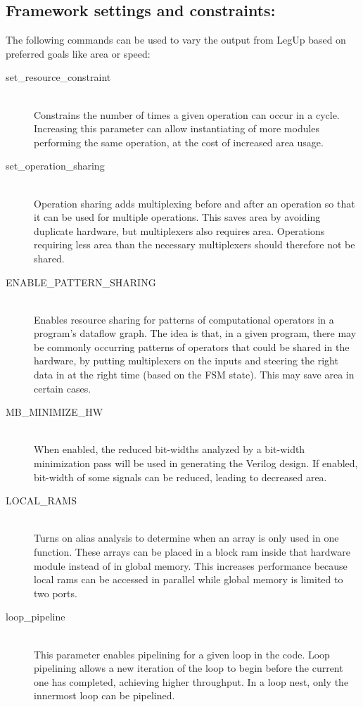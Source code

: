\subsection{Framework settings and constraints:}
The following commands can be used to vary the output from LegUp based on preferred goals like area or speed:
\begin{description}
  \item[set\_resource\_constraint] \hfill \\
      Constrains the number of times a given operation can occur in a cycle. Increasing this parameter can allow instantiating of more modules performing the same operation, at the cost of increased area usage. 
  \item[set\_operation\_sharing] \hfill \\
      Operation sharing adds multiplexing before and after an operation so that it can be used for multiple operations. This saves area by avoiding duplicate hardware, but multiplexers also requires area. Operations requiring less area than the necessary multiplexers should therefore not be shared.
  \item[ENABLE\_PATTERN\_SHARING] \hfill \\
      Enables resource sharing for patterns of computational operators in a program’s dataflow graph. The idea is that, in a given program, there may be commonly occurring patterns of operators that could be shared in the hardware, by putting multiplexers on the inputs and steering the right data in at the right time (based on the FSM state). This may save area in certain cases. \cite{hadjis2012impact}
  \item[MB\_MINIMIZE\_HW] \hfill \\
      When enabled, the reduced bit-widths analyzed by a bit-width minimization pass will be used in generating the Verilog design. If enabled, bit-width of some signals can be reduced, leading to decreased area.
  \item[LOCAL\_RAMS] \hfill \\
      Turns on alias analysis to determine when an array is only used in one function. These arrays can be placed in a block \gls{ram} inside that hardware module instead of in global memory. This increases performance because local \gls{ram}s can be accessed in parallel while global memory is limited to two ports.
  \item[loop\_pipeline] \hfill \\
     This parameter enables pipelining for a given loop in the code. Loop pipelining allows a new iteration of the loop to begin before the current one has completed, achieving higher throughput. In a loop nest, only the innermost loop can be pipelined.
\end{description}
